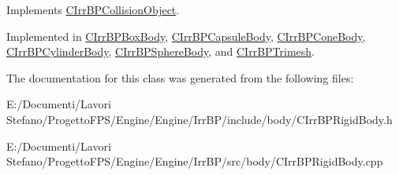 Implements \hyperlink{class_c_irr_b_p_collision_object_a8fda1f4f6c5f34f42c51645baeb436ca}{CIrrBPCollisionObject}.



Implemented in \hyperlink{class_c_irr_b_p_box_body_a144a57bdaaa418c5851f0beb97bdc44b}{CIrrBPBoxBody}, \hyperlink{class_c_irr_b_p_capsule_body_ab9815977583c6135b4b42dee8f536098}{CIrrBPCapsuleBody}, \hyperlink{class_c_irr_b_p_cone_body_a47470fa549f852a5d315f0decb4d195a}{CIrrBPConeBody}, \hyperlink{class_c_irr_b_p_cylinder_body_a966bec7330f778f276294601fc7e0c45}{CIrrBPCylinderBody}, \hyperlink{class_c_irr_b_p_sphere_body_ae5060da603f81cb391c320ef35ae80eb}{CIrrBPSphereBody}, and \hyperlink{class_c_irr_b_p_trimesh_a5106e0daefa0a7dd6198311390711255}{CIrrBPTrimesh}.



The documentation for this class was generated from the following files:\begin{DoxyCompactItemize}
\item 
E:/Documenti/Lavori Stefano/ProgettoFPS/Engine/Engine/IrrBP/include/body/CIrrBPRigidBody.h\item 
E:/Documenti/Lavori Stefano/ProgettoFPS/Engine/Engine/IrrBP/src/body/CIrrBPRigidBody.cpp\end{DoxyCompactItemize}

